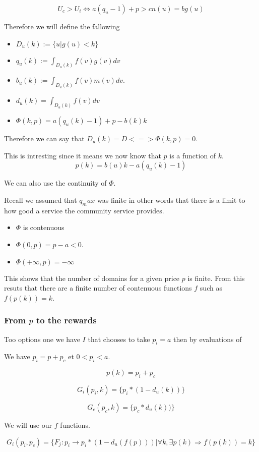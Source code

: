 \documentclass{article}
\begin{document}
$$U_c > U_i \Leftrightarrow  a (q_u -1) +p > c n(u) = b g(u)$$

Therefore we will define the fallowing
\begin{itemize}
\item $D_u(k) := \{u | g(u) < k\}$
\item $q_u(k) := \int_{D_u(k)} f(v) g(v) dv$
\item $b_u(k) :=\int_{D_u(k)} f(v) m(v) dv$.
\item $d_u(k) = \int_{D_u(k)} f(v) dv$ 
\item $\Phi(k,p) = a (q_u(k) -1) + p - b(k) k$
\end{itemize}

Therefore we can say that $D_u(k) = D <=> \Phi(k,p) = 0$.
 
This is intresting since it means we now know that $p$ is a function of $k$.
 $$p (k) = b(u) k - a(q_u(k) -1)$$

We can also use the continuity of $\Phi$.

Recall we assumed that $q_max$ was finite in other words that there is a limit to how good a service the community service provides.

\begin{itemize}
\item $\Phi$ is contenuous
\item $\Phi(0,p) = p - a < 0$.
\item $\Phi(+\infty,p) = -\infty$
\end{itemize}

This shows that the number of domains for a given price $p$ is finite. From this resuts that there are a finite number of contenuous functions $f$ such as $f(p(k)) = k$.

\subsubsection{From $p$ to the rewards}
Too options one we have $I$ that chooses to take $p_i = a$ then by evaluations of 

We have $p_i = p + p_c$ et $0 < p_i < a$.

$$p(k) = p_i + p_c$$

$$G_i (p_i,k) = \{ p_i * (1 - d_u(k)) \}$$

$$G_c (p_c,k) = \{ p_c* d_u(k)) \}$$

We will use our $f$ functions.

$$G_i (p_i,p_c) = \{ F_j : p_i \rightarrow p_i *(1 - d_u( f(p))) | \forall k, \exists p(k) \Rightarrow f(p(k)) = k \}$$
\end{document}
